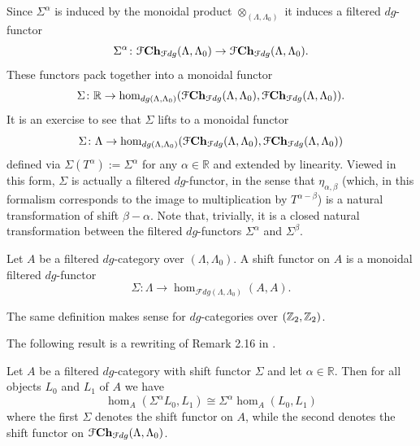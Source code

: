 Since $\Sigma^\alpha$ is induced by the monoidal product $\otimes_{(\Lambda,\Lambda_0)}$ it induces a filtered $dg$-functor $$\Sigma^\alpha\colon \mathcal{F} \mathbf{Ch}_{\mathcal{F}dg}(\Lambda,\Lambda_0)\to \mathcal{F} \mathbf{Ch}_{\mathcal{F}dg}(\Lambda,\Lambda_0).$$ These functors pack together into a monoidal functor $$\Sigma\colon \mathbb{R}\to \hom_{dg(\Lambda,\Lambda_0)}(\mathcal{F} \mathbf{Ch}_{\mathcal{F}dg}(\Lambda,\Lambda_0),\mathcal{F} \mathbf{Ch}_{\mathcal{F}dg}(\Lambda,\Lambda_0)).$$ It is an exercise to see that $\Sigma$ lifts to a monoidal functor $$\Sigma\colon \Lambda\to \hom_{dg(\Lambda,\Lambda_0)}(\mathcal{F} \mathbf{Ch}_{\mathcal{F}dg}(\Lambda,\Lambda_0),\mathcal{F} \mathbf{Ch}_{\mathcal{F}dg}(\Lambda,\Lambda_0))$$ defined via $\Sigma(T^\alpha):=\Sigma^\alpha$ for any $\alpha\in \mathbb{R}$ and extended by linearity. Viewed in this form, $\Sigma$ is actually a filtered $dg$-functor, in the sense that $\eta_{\alpha,\beta}$ (which, in this formalism corresponds to the image to multiplication by $T^{\alpha-\beta}$) is a natural transformation of shift $\beta-\alpha$. Note that, trivially, it is a closed natural transformation between the filtered $dg$-functors $\Sigma^\alpha$ and $\Sigma^\beta$.


\begin{dfn}
    Let $A$ be a filtered $dg$-category over $(\Lambda,\Lambda_0)$. A shift functor on $A$ is a monoidal filtered $dg$-functor $$\Sigma\colon \Lambda\to \hom_{\mathcal{F}dg(\Lambda,\Lambda_0)}(A,A).$$
\end{dfn}

\noindent The same definition makes sense for $dg$-categories over $(\mathbb{Z}_2,\mathbb{Z}_2)$.

The following result is a rewriting of Remark 2.16 in \cite{BCZ:tpc}.

\begin{lem}
    Let $A$ be a filtered $dg$-category with shift functor $\Sigma$ and let $\alpha\in \mathbb{R}$. Then for all objects $L_0$ and $L_1$ of $A$ we have $$\hom_{A}(\Sigma^\alpha L_0,L_1)\cong \Sigma^\alpha\hom_A(L_0,L_1)$$ where the first $\Sigma$ denotes the shift functor on $A$, while the second denotes the shift functor on $\mathcal{F} \mathbf{Ch}_{\mathcal{F}dg}(\Lambda,\Lambda_0)$.
\end{lem}

